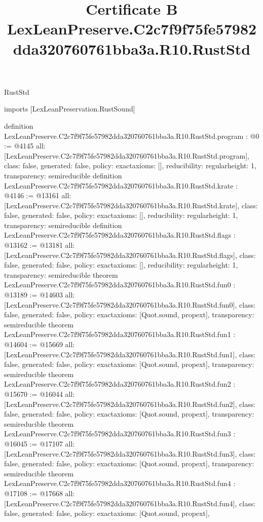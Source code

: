 \begin{lexlean}{RustStd}
\title{Certificate B LexLeanPreserve.C2c7f9f75fe57982dda320760761bba3a.R10.RustStd}
\begin{coremodule}
imports [LexLeanPreservation.RustSound]

definition LexLeanPreserve.C2c7f9f75fe57982dda320760761bba3a.R10.RustStd.program : @0 := @4145 {
  all: [LexLeanPreserve.C2c7f9f75fe57982dda320760761bba3a.R10.RustStd.program],
  class: false,
  generated: false,
  policy: exact{axioms: []},
  reducibility: regular{height: 1},
  transparency: semireducible
}
definition LexLeanPreserve.C2c7f9f75fe57982dda320760761bba3a.R10.RustStd.krate : @4146 := @13161 {
  all: [LexLeanPreserve.C2c7f9f75fe57982dda320760761bba3a.R10.RustStd.krate],
  class: false,
  generated: false,
  policy: exact{axioms: []},
  reducibility: regular{height: 1},
  transparency: semireducible
}
definition LexLeanPreserve.C2c7f9f75fe57982dda320760761bba3a.R10.RustStd.flags : @13162 := @13181 {
  all: [LexLeanPreserve.C2c7f9f75fe57982dda320760761bba3a.R10.RustStd.flags],
  class: false,
  generated: false,
  policy: exact{axioms: []},
  reducibility: regular{height: 1},
  transparency: semireducible
}
theorem LexLeanPreserve.C2c7f9f75fe57982dda320760761bba3a.R10.RustStd.fun0 : @13189 := @14603 {
  all: [LexLeanPreserve.C2c7f9f75fe57982dda320760761bba3a.R10.RustStd.fun0],
  class: false,
  generated: false,
  policy: exact{axioms: [Quot.sound, propext]},
  transparency: semireducible
}
theorem LexLeanPreserve.C2c7f9f75fe57982dda320760761bba3a.R10.RustStd.fun1 : @14604 := @15669 {
  all: [LexLeanPreserve.C2c7f9f75fe57982dda320760761bba3a.R10.RustStd.fun1],
  class: false,
  generated: false,
  policy: exact{axioms: [Quot.sound, propext]},
  transparency: semireducible
}
theorem LexLeanPreserve.C2c7f9f75fe57982dda320760761bba3a.R10.RustStd.fun2 : @15670 := @16044 {
  all: [LexLeanPreserve.C2c7f9f75fe57982dda320760761bba3a.R10.RustStd.fun2],
  class: false,
  generated: false,
  policy: exact{axioms: [Quot.sound, propext]},
  transparency: semireducible
}
theorem LexLeanPreserve.C2c7f9f75fe57982dda320760761bba3a.R10.RustStd.fun3 : @16045 := @17107 {
  all: [LexLeanPreserve.C2c7f9f75fe57982dda320760761bba3a.R10.RustStd.fun3],
  class: false,
  generated: false,
  policy: exact{axioms: [Quot.sound, propext]},
  transparency: semireducible
}
theorem LexLeanPreserve.C2c7f9f75fe57982dda320760761bba3a.R10.RustStd.fun4 : @17108 := @17668 {
  all: [LexLeanPreserve.C2c7f9f75fe57982dda320760761bba3a.R10.RustStd.fun4],
  class: false,
  generated: false,
  policy: exact{axioms: [Quot.sound, propext]},
}
\end{coremodule}
\end{lexlean}
